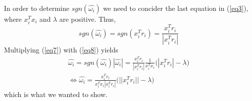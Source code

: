 \documentclass{article}
\begin{document}
In order to determine $sgn(\hat{\omega_i})$ we need to concider the last equation in (\ref{eq3}), where $x_i^T x_i$ and $\lambda$ are positive. Thus,
\begin{equation} \label{eq8}
    sgn(\hat{\omega_i}) = sgn(x_i^T r_i) = \frac{x_i^T r_i}{|x_i^T r_i|}
\end{equation}
Multiplying (\ref{eq7}) with (\ref{eq8}) yields
\begin{equation}
\begin{split}
    \hat{\omega_i} = sgn(\hat{\omega_i})|\hat{\omega_i}| = \frac{x_i^T r_i}{|x_i^T r_i|} \frac{1}{x_i^T x_i} \bigg(|x_i^T r_i| - \lambda \bigg) \\
    \Longleftrightarrow \hat{\omega_i} = \frac{x_i^T r_i}{x_i^T x_i |x_i^T r_i|} \bigg(||x_i^T r_i|| - \lambda \bigg) 
\end{split}
\end{equation}
which is what we wanted to show.
\end{document}
